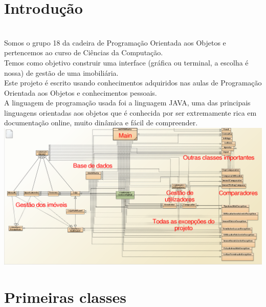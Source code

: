 \documentclass[12pt]{article}
\begin{document}
\maketitle                                            %
\pagebreak

\section{Introdução}
~\\

Somos o grupo 18 da cadeira de Programação Orientada aos Objetos e pertencemos ao curso de Ciências da Computação.
~\\ 

Temos como objetivo construir uma interface (gráfica ou terminal, a escolha é nossa) de gestão de uma imobiliária.
~\\

Este projeto é escrito usando conhecimentos adquiridos nas aulas de Programação Orientada aos Objetos e conhecimentos pessoais.
~\\

A linguagem de programação usada foi a linguagem JAVA, uma das principais linguagens orientadas aos objetos que é conhecida por ser extremamente rica em documentação online, muito dinâmica e fácil de compreender.
~\\


\includegraphics[scale=0.27]{esquema.png}	
\pagebreak

\section{Primeiras classes}
~\\
\end{document}
